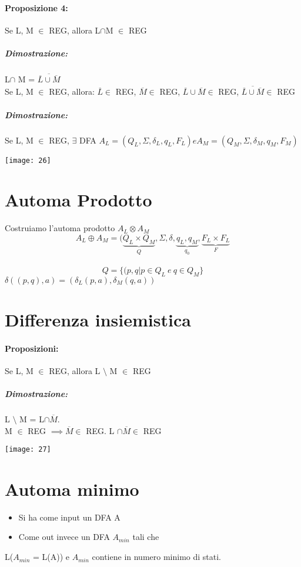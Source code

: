 \documentclass[12pt, a4paper, openany, oneside]{book}
\begin{document}
\paragraph{Proposizione 4: }Se L, M $\in$ REG, allora L$\cap$M $\in$ REG
\subparagraph{Dimostrazione: }L$\cap$ M = $\overline{\overline{L} \cup \overline{M}}$	\\
Se L, M $\in$ REG, allora: $\overline{L} \in$ REG, $\overline{M} \in$ REG, 
$\overline{L} \cup \overline{M} \in$ REG, $\overline{\overline{L}\cup\overline{M}} \in$ REG 
\subparagraph{Dimostrazione: }Se L, M $\in$ REG, $\exists$ DFA $A_{L}=(Q_{L}, 
\Sigma, \delta_{L},q_{L}, F_{L}) e A_{M} = (Q_{M}, \Sigma, \delta_{M}, q_{M}, F_{M})$
\begin{center}
\texttt{[image: 26]}
\end{center}	
\section{Automa Prodotto}
Costruiamo l'automa prodotto $A_{L} \otimes A_{M}$\\
\[A_{L} \oplus A_{M} = (\underbrace{Q_{L} \times Q_{M}}_{Q}, \Sigma, \delta, 
\underbrace{q_{L}, q_{M}}_{q_{0}}, \underbrace{F_{L}\times F_{L}}_{F} \]\\
\[Q = \{(p, q | p \in Q_{L}~ e ~ q\in Q_{M}\}\]
$\delta ((p, q), a) = (\delta_{L}(p,a), \delta_{M}(q,a))$
\section{Differenza insiemistica}
\paragraph{Proposizioni: }Se L, M $\in$ REG, allora L $\setminus$ M $\in$ REG
\subparagraph{Dimostrazione: }L $\setminus$ M = L$\cap \overline{M}$. \\
M $\in$ REG $\implies \overline{M} \in$ REG. L $\cap \overline{M} \in$ REG   
\begin{center}
\texttt{[image: 27]}
\end{center}           
\section{Automa minimo}
\begin{itemize}
	\item Si ha come input un DFA A
	\item Come out invece un DFA $A_{min}$ tali che
\end{itemize}
L($A_{min}$ = L(A)) e $A_{min}$ contiene in numero minimo di stati. 
\end{document}
